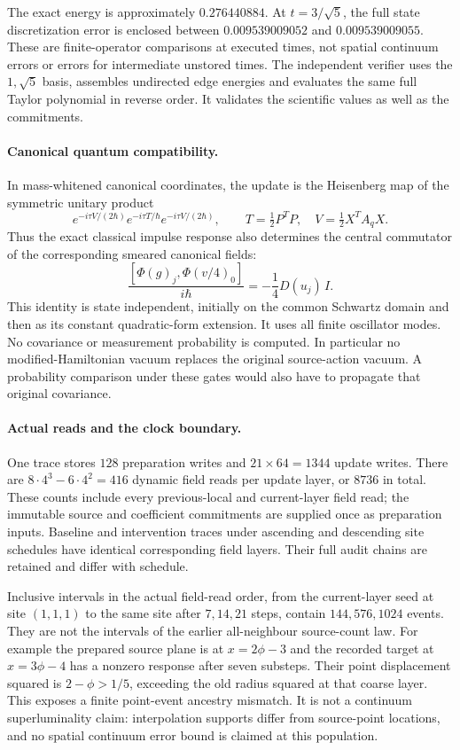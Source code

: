 The exact energy is approximately $0.276440884$. At $t=3/\sqrt5$, the
full state discretization error is enclosed between $0.009539009052$ and
$0.009539009055$. These are finite-operator comparisons at executed times,
not spatial continuum errors or errors for intermediate unstored times.
The independent verifier uses the $1,\sqrt5$ basis, assembles undirected
edge energies and evaluates the same full Taylor polynomial in reverse
order. It validates the scientific values as well as the commitments.

\paragraph{Canonical quantum compatibility.}
In mass-whitened canonical coordinates, the update is the Heisenberg map
of the symmetric unitary product
\[
 e^{-i\tau V/(2\hbar)}e^{-i\tau T/\hbar}
 e^{-i\tau V/(2\hbar)},\qquad
 T=\tfrac12P^TP,\quad V=\tfrac12X^TA_qX.
\]
Thus the exact classical impulse response also determines the central
commutator of the corresponding smeared canonical fields:
\[
 \frac{[\Phi(g)_j,\Phi(v/4)_0]}{i\hbar}
      =-\frac14D(u_j)\,I.
\]
This identity is state independent, initially on the common Schwartz
domain and then as its constant quadratic-form extension. It uses all
finite oscillator modes. No covariance or measurement probability is
computed. In particular no modified-Hamiltonian vacuum replaces the
original source-action vacuum. A probability comparison under these gates
would also have to propagate that original covariance.

\paragraph{Actual reads and the clock boundary.}
One trace stores $128$ preparation writes and $21\times64=1344$ update
writes. There are $8\cdot4^3-6\cdot4^2=416$ dynamic field reads per
update layer, or $8736$ in total. These counts include every previous-local
and current-layer field read; the immutable source and coefficient
commitments are supplied once as preparation inputs. Baseline and
intervention traces under ascending and descending site schedules have
identical corresponding field layers. Their full audit chains are retained
and differ with schedule.

Inclusive intervals in the actual field-read order, from the current-layer
seed at site $(1,1,1)$ to the same site after $7,14,21$ steps, contain
$144,576,1024$ events. They are not the intervals of the earlier all-neighbour
source-count law. For example the prepared source plane is at
$x=2\phi-3$ and the recorded target at $x=3\phi-4$ has a nonzero response
after seven substeps. Their point displacement squared is $2-\phi>1/5$,
exceeding the old radius squared at that coarse layer. This exposes a
finite point-event ancestry mismatch. It is not a continuum superluminality
claim: interpolation supports differ from source-point locations, and no
spatial continuum error bound is claimed at this population.

